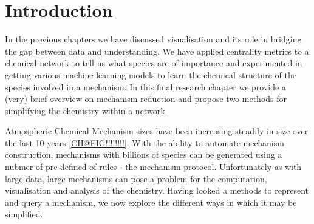 
\section{Introduction}

In the previous chapters we have discussed visualisation and its role in bridging the gap between data and understanding. We have applied centrality metrics to a chemical network to tell us what species are of importance and experimented in getting various machine learning models to learn the chemical structure of the species involved in a mechanism. In this final research chapter we provide a (very) brief overview on mechanism reduction and propose two methods for simplifying the chemistry within a network. 

Atmospheric Chemical Mechanism sizes have been increasing steadily in size over the last 10 years \autoref{CH@FIG!!!!!!!!}. With the ability to automate mechanism construction, mechanisms with billions of species can be generated using a nubmer of pre-defined of rules - the mechanism protocol. Unfortunately as with large data, large mechanisms can pose a problem for the computation, visualisation and analysis of the chemistry. Having looked a methods to represent and query a mechanism, we now explore the different ways in which it may be simplified. 


